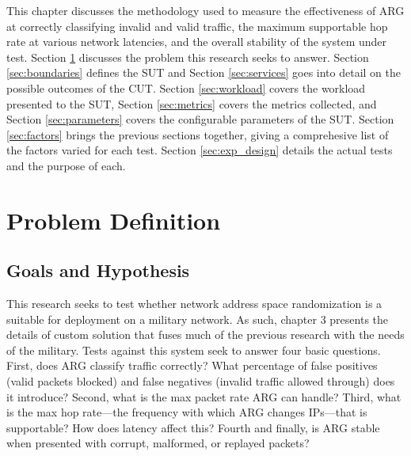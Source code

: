 \par This chapter discusses the methodology used to measure the effectiveness of \ac{ARG} at correctly classifying invalid and valid traffic, the maximum supportable hop rate at various network latencies, and the overall stability of the system under test. Section \ref{sec:problem_def} discusses the problem this research seeks to answer. Section \ref{sec:boundaries} defines the \ac{SUT} and Section \ref{sec:services} goes into detail on the possible outcomes of the \ac{CUT}. Section \ref{sec:workload} covers the workload presented to the \ac{SUT}, Section \ref{sec:metrics} covers the metrics collected, and Section \ref{sec:parameters} covers the configurable parameters of the \ac{SUT}. Section \ref{sec:factors} brings the previous sections together, giving a comprehesive list of the factors varied for each test. Section \ref{sec:exp_design} details the actual tests and the purpose of each.

\section{Problem Definition}
\label{sec:problem_def}
\subsection{Goals and Hypothesis}
\label{sec:goals}
\par This research seeks to test whether network address space randomization is a suitable for deployment on a military network. As such, chapter 3 presents the details of custom solution that fuses much of the previous research with the needs of the military. Tests against this system seek to answer four basic questions.  First, does \ac{ARG} classify traffic correctly? What percentage of false positives (valid packets blocked) and false negatives (invalid traffic allowed through) does it introduce? Second, what is the max packet rate \ac{ARG} can handle? Third, what is the max hop rate---the frequency with which \ac{ARG} changes \acp{IP}---that is supportable? How does latency affect this? Fourth and finally, is \ac{ARG} stable when presented with corrupt, malformed, or replayed packets?


